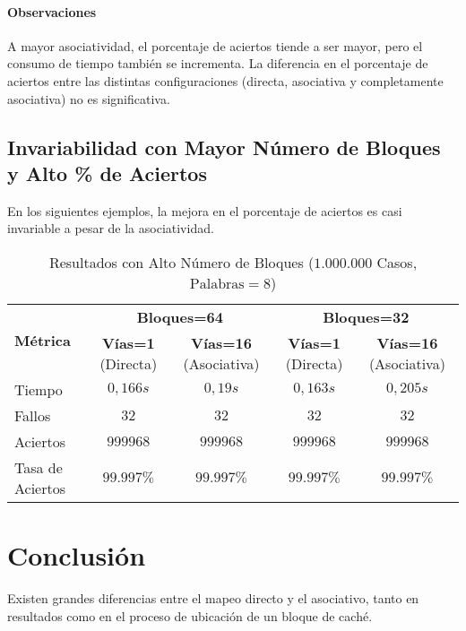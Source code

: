 \documentclass{article}
\begin{document}
\paragraph{Observaciones}
A mayor asociatividad, el porcentaje de aciertos tiende a ser mayor, pero el consumo de tiempo también se incrementa. La diferencia en el porcentaje de aciertos entre las distintas configuraciones (directa, asociativa y completamente asociativa) no es significativa.

\subsection{Invariabilidad con Mayor Número de Bloques y Alto \% de Aciertos}
En los siguientes ejemplos, la mejora en el porcentaje de aciertos es casi invariable a pesar de la asociatividad.

\begin{longtable}{|p{1.5cm}|c|c|c|c|}
\caption{Resultados con Alto Número de Bloques ($\text{1.000.000}$ Casos, $\text{Palabras}=8$)} \label{tab:invariabilidad} \\
\hline
\multirow{2}{*}{\textbf{Métrica}} & \multicolumn{2}{c|}{\textbf{Bloques=64}} & \multicolumn{2}{c|}{\textbf{Bloques=32}} \\
\cline{2-5}
& \textbf{Vías=1} (Directa) & \textbf{Vías=16} (Asociativa) & \textbf{Vías=1} (Directa) & \textbf{Vías=16} (Asociativa) \\
\hhline{|=|=|=|=|=|}
Tiempo & $0,166s$ & $0,19s$ & $0,163s$ & $0,205s$\\
\hline
Fallos & $32$ & $32$ & $32$  & $32$  \\
\hline
Aciertos & $999968$  & $999968$ & $999968$ & $999968$  \\
\hline
Tasa de Aciertos & $99.997\%$  & $99.997\%$  & $99.997\%$  & $99.997\%$  \\
\hline
\end{longtable}

\section{Conclusión}
Existen grandes diferencias entre el mapeo directo y el asociativo, tanto en resultados como en el proceso de ubicación de un bloque de caché.
\end{document}
